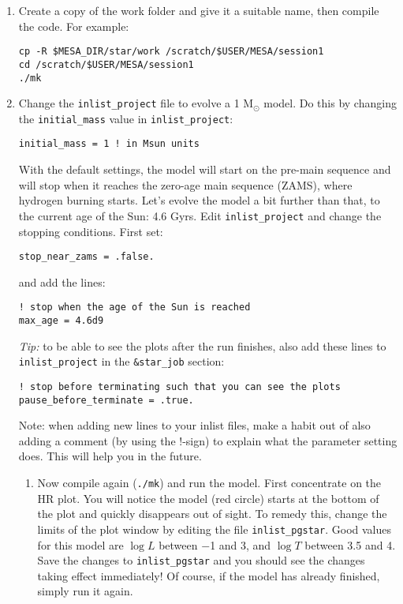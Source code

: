 \documentclass[11pt,a4paper]{article}
\begin{document}
\begin{enumerate}

\item Create a copy of the work folder and give it a suitable name, then compile the code. For example:
\begin{verbatim}
cp -R $MESA_DIR/star/work /scratch/$USER/MESA/session1
cd /scratch/$USER/MESA/session1
./mk
\end{verbatim}

\item Change the \verb|inlist_project| file to evolve a 1 M$_\odot$ model. Do this by changing the \texttt{initial\_mass} value in \verb|inlist_project|:
\begin{verbatim}
initial_mass = 1 ! in Msun units
\end{verbatim}
With the default settings, the model will start on the pre-main sequence and will stop when it reaches the zero-age main sequence (ZAMS), where hydrogen burning starts. Let's evolve the model a bit further than that, to the current age of the Sun: 4.6 Gyrs. Edit \verb|inlist_project| and change the stopping conditions. First set:
\begin{verbatim}
stop_near_zams = .false.
\end{verbatim}
and add the lines:
\begin{verbatim}
! stop when the age of the Sun is reached
max_age = 4.6d9
\end{verbatim}
\textit{Tip:} to be able to see the plots after the run finishes, also add these lines to \verb|inlist_project| in the \verb|&star_job| section:
\begin{verbatim}
! stop before terminating such that you can see the plots
pause_before_terminate = .true.
\end{verbatim}
Note: when adding new lines to your inlist files, make a habit out of also adding a comment (by using the !-sign) to explain what the parameter setting does. This will help you in the future.
\begin{enumerate}
\item Now compile again (\verb|./mk|) and run the model. First concentrate on the HR plot. You will notice the model (red circle) starts at the bottom of the plot and quickly disappears out of sight. To remedy this, change the limits of the plot window by editing the file \verb|inlist_pgstar|. Good values for this model are $\log L$ between $-$1 and 3, and $\log T$ between 3.5 and 4. Save the changes to \verb|inlist_pgstar| and you should see the changes taking effect immediately! Of course, if the model has already finished, simply run it again. \\[1ex]

\end{enumerate}
\end{enumerate}
\end{document}
